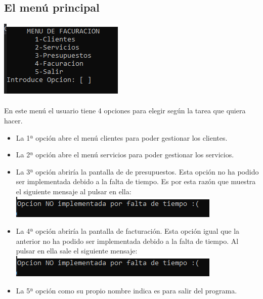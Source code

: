 \documentclass[12pt]{article}
\begin{document}
\subsection{El menú principal}
\includegraphics[]{MenuPrincipal.PNG}\\\\
En este menú el usuario tiene 4 opciones para elegir según la tarea que quiera hacer.
\begin{itemize}
    \item La 1ª opción abre el menú clientes para poder gestionar los clientes.
    \item La 2ª opción abre el menú servicios para poder gestionar los servicios.
    \item La 3ª opción abriría la pantalla de de presupuestos. Esta opción no ha podido ser implementada debido a la falta de tiempo. Es por esta razón que muestra el siguiente mensaje al pulsar en ella:\\
    \includegraphics[]{OpcionNoImplementada.PNG} 
    \item La 4ª opción abriría la pantalla de facturación. Esta opción igual que la anterior no ha podido ser implementada debido a la falta de tiempo. Al pulsar en ella sale el siguiente mensaje:\\ 
    \includegraphics[]{OpcionNoImplementada.PNG}
    \item La 5ª opción como su propio nombre indica es para salir del programa.
\end{itemize}
\end{document}
